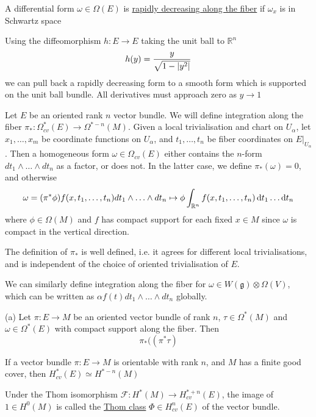 \begin{defn}
	A differential form $\omega\in \Omega(E)$ is \underline{rapidly decreasing
	along the fiber} if  $\omega_x$ is in Schwartz space
\end{defn}

Using the diffeomorphism $h : E \to E$ taking the unit ball to $\mathbb{R}^n$
\[
	h(y) = \frac{y}{\sqrt{1-\abs{y^2}} }
\] 
we can pull back a rapidly decreasing form to a smooth form which is supported
on the unit ball bundle. 
All derivatives must approach zero as $y \to 1$


Let $E$ be an oriented rank  $n$ vector bundle. We will define integration along
the fiber $\pi_* : \Omega^*_{cv}(E) \to \Omega^{*-n}(M)$. 
Given a local trivialisation and chart on $U_\alpha$, let $x_1,\ldots,x_m$ be 
coordinate functions on $U_\alpha$, and  $t_1,\ldots,t_n$ be fiber coordinates
on $E|_{U_{\alpha}}$. Then a homogeneous form $\omega\in \Omega_{cv}(E)$ either 
contains the $n$-form  $dt_1\wedge \ldots\wedge dt_n$ as a factor, or does not. 
In the latter case, we define $\pi_*(\omega) = 0$, and otherwise 
\[
\omega = (\pi^*\phi)f(x,t_1,\ldots,t_n)dt_1\wedge\ldots\wedge dt_n
\mapsto \phi\int_{\mathbb{R}^n} f(x,t_1,\ldots,t_n) \odif{t_1}\ldots\odif{t_n}
\] 
where $\phi\in\Omega(M)$ and  $f$ has compact support for each fixed  $x\in M$
since  $\omega$ is compact in the vertical direction. 

The definition of $\pi_*$ is well defined, i.e. it agrees for different local
trivialisations, and is independent of the choice of oriented trivialisation of
 $E$. %


We can similarly define integration along the fiber for $\omega\in
W(\mathfrak{g})\otimes \Omega(V)$, which can be written as $\alpha
f(t)dt_1\wedge\ldots\wedge dt_n$ globally.


\begin{prop} %
	(a) Let $\pi : E \to M$ be an oriented vector bundle of rank  $n$,
	$\tau\in\Omega^*(M)$ and  $\omega\in \Omega^*(E)$ with compact support
	along the fiber. Then 
	 \[
	\pi_*((\pi^*\tau)  
	\] 
\end{prop}
\begin{thm} %
	If a vector bundle $\pi: E \to M$ is orientable with rank $n$, and $M$ has a
	finite good cover, then 
	 $H^*_{cv}(E) \simeq H^{*-n}(M)$
\end{thm}
\begin{defn}
	Under the Thom isomorphism $\mathcal{F}:H^*(M)\to H_{cv}^{*+n}(E)$, the
	image of $1\in H^0(M)$ is called the \underline{Thom class}  $\Phi\in
	H_{cv}^n(E)$ of the vector bundle.
\end{defn}



